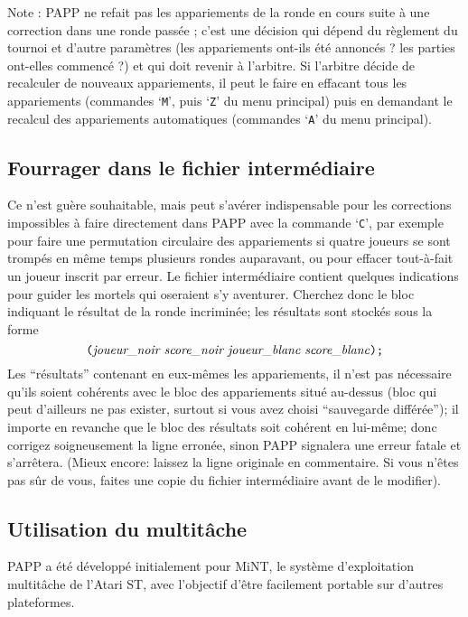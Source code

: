 \documentclass[10pt]{article}
\begin{document}
Note : PAPP ne refait pas les appariements de la ronde en cours suite 
\`a une correction dans une ronde pass\'ee ; c'est une d\'ecision qui 
d\'epend du r\`eglement du tournoi et d'autre param\`etres (les 
appariements ont-ils \'et\'e annonc\'es ?  les parties ont-elles 
commenc\'e ?)  et qui doit revenir \`a l'arbitre.  Si l'arbitre 
d\'ecide de recalculer de nouveaux appariements, il peut le faire en 
effacant tous les appariements (commandes `\verb|M|', puis `\verb|Z|' 
du menu principal) puis en demandant le recalcul des appariements 
automatiques (commandes `\verb|A|' du menu principal).

\subsection{Fourrager dans le fichier interm\'ediaire}

Ce n'est gu\`ere souhaitable, mais peut s'av\'erer indispensable pour 
les corrections impossibles \`a faire directement dans PAPP avec la 
commande `\verb|C|', par exemple pour faire une permutation circulaire 
des appariements si quatre joueurs se sont tromp\'es en m\^eme temps 
plusieurs rondes auparavant, ou pour effacer tout-\`a-fait un joueur 
inscrit par erreur.  Le fichier interm\'ediaire contient quelques 
indications pour guider les mortels qui oseraient s'y aventurer.  
Cherchez donc le bloc indiquant le r\'esultat de la ronde 
incrimin\'ee; les r\'esultats sont stock\'es sous la forme 
$$\hbox{\verb|(|{\it joueur\_noir score\_noir joueur\_blanc 
score\_blanc\/}\verb|);|}
 $$
Les ``r\'esultats'' contenant en eux-m\^emes les appariements, il 
n'est pas n\'ecessaire qu'ils soient coh\'erents avec le bloc des 
appariements situ\'e au-dessus (bloc qui peut d'ailleurs ne pas 
exister, surtout si vous avez choisi ``sauvegarde diff\'er\'ee''); il 
importe en revanche que le bloc des r\'esultats soit coh\'erent en 
lui-m\^eme; donc corrigez soigneusement la ligne erron\'ee, sinon PAPP 
signalera une erreur fatale et s'arr\^etera.  (Mieux encore: laissez 
la ligne originale en commentaire.  Si vous n'\^etes pas s\^ur de 
vous, faites une copie du fichier interm\'ediaire avant de le 
modifier).

\subsection{Utilisation du multit\^ache}

PAPP a \'et\'e d\'evelopp\'e initialement pour MiNT, le syst\`eme 
d'exploitation multit\^ache de l'Atari ST, avec l'objectif d'\^etre 
facilement portable sur d'autres plateformes.
\end{document}
